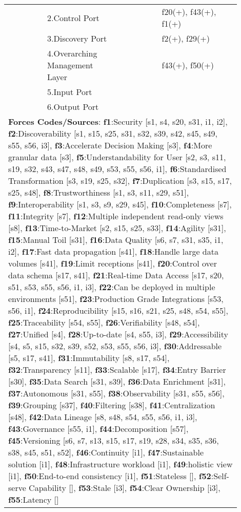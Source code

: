 \begin{tabular}{|p{0.12\linewidth}|p{0.015\linewidth}|p{0.3\linewidth}|p{0.15\linewidth}|p{0.31\linewidth}|}
 & \cellcolor{emerald_shape_4}{} & 2.Control Port&\cellcolor{emerald_shape_5}{s49, s52, i1, i2, i4, i6} & f20(+), f43(+), f1(+)\\
 & \cellcolor{emerald_shape_4}{} & 3.Discovery Port&\cellcolor{emerald_shape_5}{s20, s25, s49, s52, i3, i4} & f2(+), f29(+)\\
 & \cellcolor{emerald_shape_4}{} & 4.Overarching Management Layer&\cellcolor{emerald_shape_4}{i1, i2, i6} & f43(+), f50(+)\\
 & \cellcolor{emerald_shape_4}{} & 5.Input Port&\cellcolor{emerald_shape_2}{i4} & \\
 & \multirow{-6}{\linewidth}{ \cellcolor{emerald_shape_4}{15}} &6.Output Port&\cellcolor{emerald_shape_2}{i4} & \\
\hline
\multicolumn{5}{l}{\parbox{\textwidth}{\smallskip
{\bf Forces Codes/Sources}: {\bf f1}:Security [s1, s4, s20, s31, i1, i2], {\bf f2}:Discoverability [s1, s15, s25, s31, s32, s39, s42, s45, s49, s55, s56, i3], {\bf f3}:Accelerate Decision Making [s3], {\bf f4}:More granular data [s3], {\bf f5}:Understandability for User [s2, s3, s11, s19, s32, s43, s47, s48, s49, s53, s55, s56, i1], {\bf f6}:Standardised Transformation [s3, s19, s25, s32], {\bf f7}:Duplication [s3, s15, s17, s25, s48], {\bf f8}:Trustworthiness [s1, s3, s11, s29, s51], {\bf f9}:Interoperability [s1, s3, s9, s29, s45], {\bf f10}:Completeness [s7], {\bf f11}:Integrity [s7], {\bf f12}:Multiple independent read-only views [s8], {\bf f13}:Time-to-Market [s2, s15, s25, s33], {\bf f14}:Agility [s31], {\bf f15}:Manual Toil [s31], {\bf f16}:Data Quality [s6, s7, s31, s35, i1, i2], {\bf f17}:Fast data propagation [s41], {\bf f18}:Handle large data volumes [s41], {\bf f19}:Limit receptions [s41], {\bf f20}:Control over data schema [s17, s41], {\bf f21}:Real-time Data Access [s17, s20, s51, s53, s55, s56, i1, i3], {\bf f22}:Can be deployed in multiple environments [s51], {\bf f23}:Production Grade Integrations [s53, s56, i1], {\bf f24}:Reproducibility [s15, s16, s21, s25, s48, s54, s55], {\bf f25}:Traceability [s54, s55], {\bf f26}:Verifiability [s48, s54], {\bf f27}:Unified [s4], {\bf f28}:Up-to-date [s4, s55, i3], {\bf f29}:Accessibility [s4, s5, s15, s32, s39, s52, s53, s55, s56, i3], {\bf f30}:Addressable [s5, s17, s41], {\bf f31}:Immutability [s8, s17, s54], {\bf f32}:Transparency [s11], {\bf f33}:Scalable [s17], {\bf f34}:Entry Barrier [s30], {\bf f35}:Data Search [s31, s39], {\bf f36}:Data Enrichment [s31], {\bf f37}:Autonomous [s31, s55], {\bf f38}:Observability [s31, s55, s56], {\bf f39}:Grouping [s37], {\bf f40}:Filtering [s38], {\bf f41}:Centralization [s48], {\bf f42}:Data Lineage [s8, s48, s54, s55, s56, i1, i3], {\bf f43}:Governance [s55, i1], {\bf f44}:Decomposition [s57], {\bf f45}:Versioning [s6, s7, s13, s15, s17, s19, s28, s34, s35, s36, s38, s45, s51, s52], {\bf f46}:Continuity [i1], {\bf f47}:Sustainable solution [i1], {\bf f48}:Infrastructure workload [i1], {\bf f49}:holistic view [i1], {\bf f50}:End-to-end consistency [i1], {\bf f51}:Stateless [], {\bf f52}:Self-serve Capability [], {\bf f53}:Stale [i3], {\bf f54}:Clear Ownership [i3], {\bf f55}:Latency []}}
\end{tabular}
